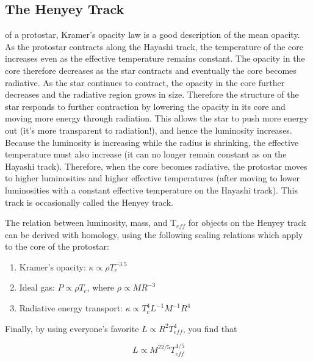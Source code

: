 \subsection{The Henyey Track}
of a protostar, Kramer's opacity law is a good description of the mean opacity.
As the protostar contracts along the Hayashi track, the temperature of the core increases
even as the effective temperature remains constant.  The opacity in the core therefore decreases
as the star contracts and eventually the core becomes radiative.  As the star continues to
contract, the opacity in the core further decreases and the radiative region grows in size.
Therefore the structure of the star responds to further contraction by lowering the opacity
in its core and moving more energy through radiation.  This allows the star to push more energy
out (it's more transparent to radiation!), and hence the luminosity increases.  Because the
luminosity is increasing while the radius is shrinking, the effective temperature must also
increase (it can no longer remain constant as on the Hayashi track).  Therefore, when the core becomes radiative, the protostar moves to higher luminosities and
higher effective temperatures (after moving to lower luminosities with a constant effective
temperature on the Hayashi track).  This track is occasionally called the Henyey track.

\indent The relation between luminosity, mass, and T$_{eff}$ for objects on the Henyey track can be derived with homology, using the following scaling relations which apply to the core of the protostar:

\begin{enumerate}
	\item Kramer's opacity: $\kappa \propto \rho T_{c}^{-3.5}$
	\item Ideal gas: $P \propto \rho T_{c}$, where $\rho \propto M R^{-3}$
	\item Radiative energy transport: $\kappa \propto T_{c}^{4} L^{-1} M^{-1} R^{4}$
\end{enumerate}

\noindent Finally, by using everyone's favorite $L \propto R^{2} T_{eff}^{4}$, you find that

\begin{equation}
L \propto M^{22/5} T_{eff}^{4/5}
\end{equation}

